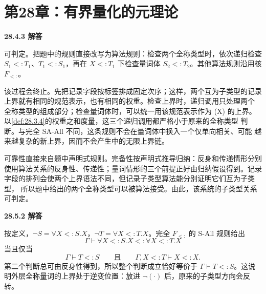 \newpage
\section*{第28章：有界量化的元理论}

\begin{taplsolutionentrybox}
\label{sol:translator:28.4.3}
\textbf{28.4.3 解答}

可判定。把题中的规则直接改写为算法规则：检查两个全称类型时，依次递归检查
\(S_1<:T_1\)、\(T_1<:S_1\)，再在 \(X<:T_1\) 下检查量词体
\(S_2<:T_2\)。其他算法规则沿用核 \(F_{<:}\)。

该过程会终止。先把记录字段按标签排成固定次序；这样，两个互为子类型的记录
上界就有相同的规范表示，也有相同的权重。检查上界时，递归调用只处理两个
全称类型的组成部分；检查量词体时，可以统一用该规范表示作为 (X) 的上界。
以\cref{def:28.3.4}的权重之和度量，这三个递归调用都严格小于原来的全称类型
判断。与完全 SA-All 不同，这条规则不会在量词体中换入一个仅单向相关、可能
越来越复杂的新上界，因而不会产生中的无限上界链。

可靠性直接来自题中声明式规则。完备性按声明式推导归纳：反身和传递情形分别
使用算法关系的反身性、传递性；量词情形的三个前提正好由归纳假设得到。记录
字段的排列会使两个上界语法不同，但记录子类型算法能分别证明它们互为子类型，
所以题中给出的两个全称类型可以被算法接受。由此，该系统的子类型关系可判定。
\end{taplsolutionentrybox}

\begin{taplsolutionentrybox}
\label{sol:translator:28.5.2}
\textbf{28.5.2 解答}

按定义，\(\neg S=\forall X<:S.X\)，\(\neg T=\forall X<:T.X\)。完全
\(F_{<:}\) 的 S-All 规则给出
\[
\Gamma\vdash\forall X<:S.X<:\forall X<:T.X
\]
当且仅当
\[
\Gamma\vdash T<:S
\qquad\text{且}\qquad
\Gamma,X<:T\vdash X<:X.
\]
第二个判断总可由反身性得到，所以整个判断成立恰好等价于
\(\Gamma\vdash T<:S\)。这说明外层全称量词的上界处于逆变位置：放进
\(\neg(\cdot)\) 后，原来的子类型方向会反转。
\end{taplsolutionentrybox}

